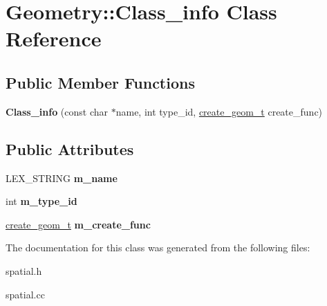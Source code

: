 \hypertarget{classGeometry_1_1Class__info}{}\section{Geometry\+:\+:Class\+\_\+info Class Reference}
\label{classGeometry_1_1Class__info}
\subsection*{Public Member Functions}
\begin{DoxyCompactItemize}
\item 
\mbox{\label{classGeometry_1_1Class__info_a072d89037da37965ce350f6cf9c394a3}} 
{\bfseries Class\+\_\+info} (const char $\ast$name, int type\+\_\+id, \mbox{\hyperlink{classGeometry_a5f04b62bea15d6fccaaef20e29539610}{create\+\_\+geom\+\_\+t}} create\+\_\+func)
\end{DoxyCompactItemize}
\subsection*{Public Attributes}
\begin{DoxyCompactItemize}
\item 
\mbox{\label{classGeometry_1_1Class__info_ac9cff265c204c5f4ee1460b6c5bdb743}} 
L\+E\+X\+\_\+\+S\+T\+R\+I\+NG {\bfseries m\+\_\+name}
\item 
\mbox{\label{classGeometry_1_1Class__info_aaefc7a32edd5f32c453ac42bf282f997}} 
int {\bfseries m\+\_\+type\+\_\+id}
\item 
\mbox{\label{classGeometry_1_1Class__info_afdfc27b743aa48355766690a3871ff31}} 
\mbox{\hyperlink{classGeometry_a5f04b62bea15d6fccaaef20e29539610}{create\+\_\+geom\+\_\+t}} {\bfseries m\+\_\+create\+\_\+func}
\end{DoxyCompactItemize}


The documentation for this class was generated from the following files\+:\begin{DoxyCompactItemize}
\item 
spatial.\+h\item 
spatial.\+cc\end{DoxyCompactItemize}
